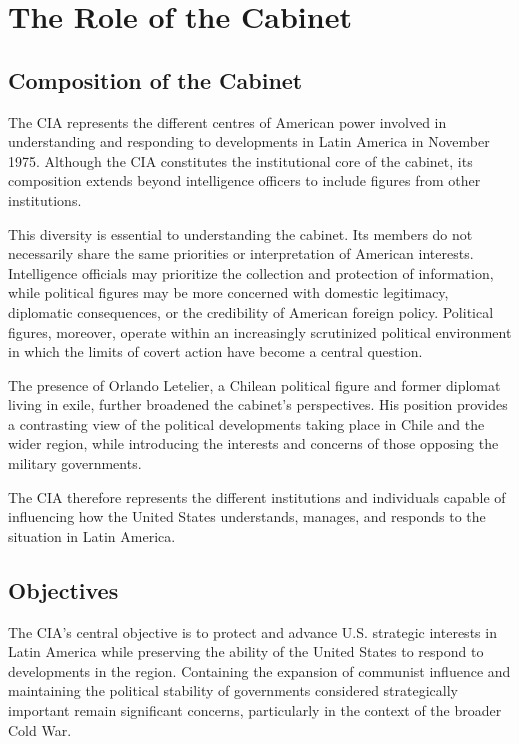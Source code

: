 \section{The Role of the Cabinet}

\subsection{Composition of the Cabinet}

The CIA represents the different centres of American power involved in understanding and responding to developments in Latin America in November 1975. Although the CIA constitutes the institutional core of the cabinet, its composition extends beyond intelligence officers to include figures from other institutions.

This diversity is essential to understanding the cabinet. Its members do not necessarily share the same priorities or interpretation of American interests. Intelligence officials may prioritize the collection and protection of information, while political figures may be more concerned with domestic legitimacy, diplomatic consequences, or the credibility of American foreign policy. Political figures, moreover, operate within an increasingly scrutinized political environment in which the limits of covert action have become a central question.

The presence of Orlando Letelier, a Chilean political figure and former diplomat living in exile, further broadened the cabinet’s perspectives. His position provides a contrasting view of the political developments taking place in Chile and the wider region, while introducing the interests and concerns of those opposing the military governments.

The CIA therefore represents the different institutions and individuals capable of influencing how the United States understands, manages, and responds to the situation in Latin America.

\subsection{Objectives}

The CIA’s central objective is to protect and advance U.S. strategic interests in Latin America while preserving the ability of the United States to respond to developments in the region. Containing the expansion of communist influence and maintaining the political stability of governments considered strategically important remain significant concerns, particularly in the context of the broader Cold War.


